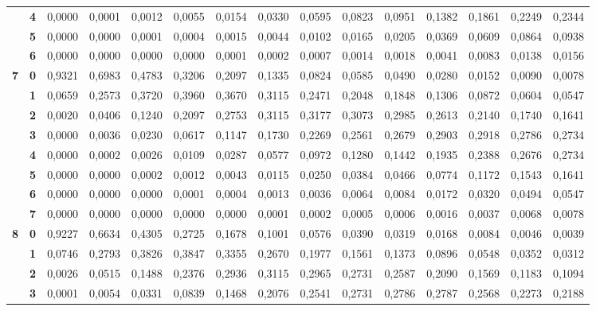 \documentclass[11pt,a4paper]{article}
\begin{document}
\begin{center}
\begin{tabular}{cc|ccccccccccccc}
 & \textbf{4} & 0,0000 & 0,0001 & 0,0012 & 0,0055 & 0,0154 & 0,0330 & 0,0595 & 0,0823 & 0,0951 & 0,1382 & 0,1861 & 0,2249 & 0,2344\\
 & \textbf{5} & 0,0000 & 0,0000 & 0,0001 & 0,0004 & 0,0015 & 0,0044 & 0,0102 & 0,0165 & 0,0205 & 0,0369 & 0,0609 & 0,0864 & 0,0938\\
 & \textbf{6} & 0,0000 & 0,0000 & 0,0000 & 0,0000 & 0,0001 & 0,0002 & 0,0007 & 0,0014 & 0,0018 & 0,0041 & 0,0083 & 0,0138 & 0,0156\\
\midrule
\multirow{8}{*}{\textbf{7}} & \textbf{0} & 0,9321 & 0,6983 & 0,4783 & 0,3206 & 0,2097 & 0,1335 & 0,0824 & 0,0585 & 0,0490 & 0,0280 & 0,0152 & 0,0090 & 0,0078\\
 & \textbf{1} & 0,0659 & 0,2573 & 0,3720 & 0,3960 & 0,3670 & 0,3115 & 0,2471 & 0,2048 & 0,1848 & 0,1306 & 0,0872 & 0,0604 & 0,0547\\
 & \textbf{2} & 0,0020 & 0,0406 & 0,1240 & 0,2097 & 0,2753 & 0,3115 & 0,3177 & 0,3073 & 0,2985 & 0,2613 & 0,2140 & 0,1740 & 0,1641\\
 & \textbf{3} & 0,0000 & 0,0036 & 0,0230 & 0,0617 & 0,1147 & 0,1730 & 0,2269 & 0,2561 & 0,2679 & 0,2903 & 0,2918 & 0,2786 & 0,2734\\
 & \textbf{4} & 0,0000 & 0,0002 & 0,0026 & 0,0109 & 0,0287 & 0,0577 & 0,0972 & 0,1280 & 0,1442 & 0,1935 & 0,2388 & 0,2676 & 0,2734\\
 & \textbf{5} & 0,0000 & 0,0000 & 0,0002 & 0,0012 & 0,0043 & 0,0115 & 0,0250 & 0,0384 & 0,0466 & 0,0774 & 0,1172 & 0,1543 & 0,1641\\
 & \textbf{6} & 0,0000 & 0,0000 & 0,0000 & 0,0001 & 0,0004 & 0,0013 & 0,0036 & 0,0064 & 0,0084 & 0,0172 & 0,0320 & 0,0494 & 0,0547\\
 & \textbf{7} & 0,0000 & 0,0000 & 0,0000 & 0,0000 & 0,0000 & 0,0001 & 0,0002 & 0,0005 & 0,0006 & 0,0016 & 0,0037 & 0,0068 & 0,0078\\
\midrule
\multirow{9}{*}{\textbf{8}} & \textbf{0} & 0,9227 & 0,6634 & 0,4305 & 0,2725 & 0,1678 & 0,1001 & 0,0576 & 0,0390 & 0,0319 & 0,0168 & 0,0084 & 0,0046 & 0,0039\\
 & \textbf{1} & 0,0746 & 0,2793 & 0,3826 & 0,3847 & 0,3355 & 0,2670 & 0,1977 & 0,1561 & 0,1373 & 0,0896 & 0,0548 & 0,0352 & 0,0312\\
 & \textbf{2} & 0,0026 & 0,0515 & 0,1488 & 0,2376 & 0,2936 & 0,3115 & 0,2965 & 0,2731 & 0,2587 & 0,2090 & 0,1569 & 0,1183 & 0,1094\\
 & \textbf{3} & 0,0001 & 0,0054 & 0,0331 & 0,0839 & 0,1468 & 0,2076 & 0,2541 & 0,2731 & 0,2786 & 0,2787 & 0,2568 & 0,2273 & 0,2188\\

\end{tabular}
\end{center}
\end{document}
